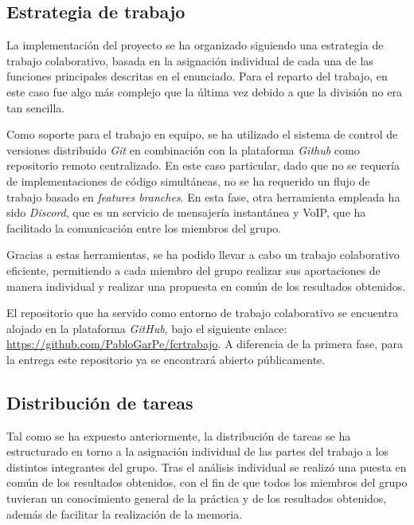 \documentclass[11pt,a4paper]{article}
\begin{document}
\subsection{Estrategia de trabajo}
La implementación del proyecto se ha organizado siguiendo una estrategia de trabajo colaborativo, basada en la asignación individual de cada una de las funciones principales descritas en el enunciado. Para el reparto del trabajo, en este caso fue algo más complejo que la última vez debido a que la división no era tan sencilla. \vspace{2ex}

\noindent Como soporte para el trabajo en equipo, se ha utilizado el sistema de control de versiones distribuido \textit{Git} en combinación con la plataforma \textit{Github} como repositorio remoto centralizado. En este caso particular, dado que no se requería de implementaciones de código simultáneas, no se ha requerido un flujo de trabajo basado en \textit{features branches}. En esta fase, otra herramienta empleada ha sido \textit{Discord}, que es un servicio de mensajería instantánea y VoIP, que ha facilitado la comunicación entre los miembros del grupo. \vspace{2ex}

\noindent Gracias a estas herramientas, se ha podido llevar a cabo un trabajo colaborativo eficiente, permitiendo a cada miembro del grupo realizar sus aportaciones de manera individual y realizar una propuesta en común de los resultados obtenidos.

\noindent El repositorio que ha servido como entorno de trabajo colaborativo se encuentra alojado en la plataforma \textit{GitHub}, bajo el siguiente enlace: \href{https://github.com/PabloGarPe/fcrtrabajo}{https://github.com/PabloGarPe/fcrtrabajo}. A diferencia de la primera fase, para la entrega este repositorio ya se encontrará abierto públicamente.\vspace{5ex}

\subsection{Distribución de tareas}
Tal como se ha expuesto anteriormente, la distribución de tareas se ha estructurado en torno a la asignación individual de las partes del trabajo a los distintos integrantes del grupo. Tras el análisis individual se realizó una puesta en común de los resultados obtenidos, con el fin de que todos los miembros del grupo tuvieran un conocimiento general de la práctica y de los resultados obtenidos, además de facilitar la realización de la memoria. \vspace{2ex}
\end{document}

